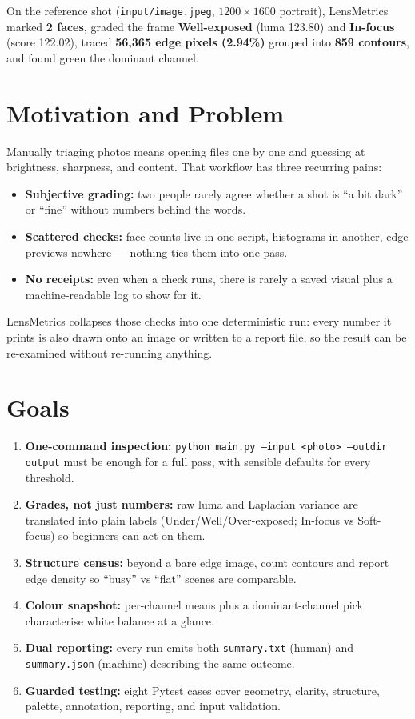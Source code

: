 \documentclass[11pt,a4paper]{article}
\begin{document}
On the reference shot (\texttt{input/image.jpeg}, $1200 \times 1600$ portrait),
LensMetrics marked \textbf{2 faces}, graded the frame \textbf{Well-exposed}
(luma 123.80) and \textbf{In-focus} (score 122.02), traced \textbf{56,365 edge
pixels (2.94\%)} grouped into \textbf{859 contours}, and found green the
dominant channel.

\section{Motivation and Problem}
Manually triaging photos means opening files one by one and guessing at
brightness, sharpness, and content. That workflow has three recurring pains:

\begin{itemize}[leftmargin=1.5em]
  \item \textbf{Subjective grading:} two people rarely agree whether a shot is
    ``a bit dark'' or ``fine'' without numbers behind the words.
  \item \textbf{Scattered checks:} face counts live in one script, histograms
    in another, edge previews nowhere --- nothing ties them into one pass.
  \item \textbf{No receipts:} even when a check runs, there is rarely a saved
    visual plus a machine-readable log to show for it.
\end{itemize}

LensMetrics collapses those checks into one deterministic run: every number it
prints is also drawn onto an image or written to a report file, so the result
can be re-examined without re-running anything.

\section{Goals}
\begin{enumerate}[leftmargin=1.5em]
  \item \textbf{One-command inspection:} \texttt{python main.py --input
    <photo> --outdir output} must be enough for a full pass, with sensible
    defaults for every threshold.
  \item \textbf{Grades, not just numbers:} raw luma and Laplacian variance are
    translated into plain labels (Under/Well/Over-exposed; In-focus vs
    Soft-focus) so beginners can act on them.
  \item \textbf{Structure census:} beyond a bare edge image, count contours
    and report edge density so ``busy'' vs ``flat'' scenes are comparable.
  \item \textbf{Colour snapshot:} per-channel means plus a dominant-channel
    pick characterise white balance at a glance.
  \item \textbf{Dual reporting:} every run emits both \texttt{summary.txt}
    (human) and \texttt{summary.json} (machine) describing the same outcome.
  \item \textbf{Guarded testing:} eight Pytest cases cover geometry, clarity,
    structure, palette, annotation, reporting, and input validation.
\end{enumerate}
\end{document}
